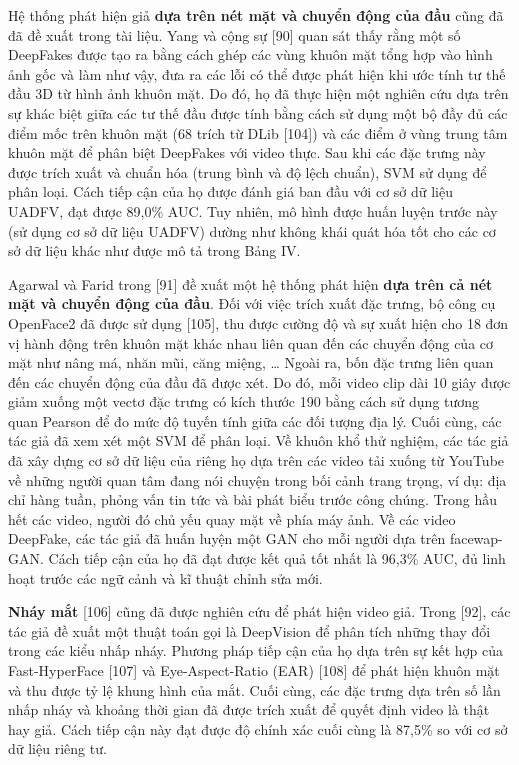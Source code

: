 \documentclass{article}
\begin{document}
Hệ thống phát hiện giả \textbf{dựa trên nét mặt và chuyển động của đầu} cũng đã đã đề xuất trong tài liệu. Yang và cộng sự [90] quan sát thấy rằng một số DeepFakes được tạo ra bằng cách ghép các vùng khuôn mặt tổng hợp vào hình ảnh gốc và làm như vậy, đưa ra các lỗi có thể được phát hiện khi ước tính tư thế đầu 3D từ hình ảnh khuôn mặt. Do đó, họ đã thực hiện một nghiên cứu dựa trên sự khác biệt giữa các tư thế đầu được tính bằng cách sử dụng một bộ đầy đủ các điểm mốc trên khuôn mặt (68 trích từ DLib [104]) và các điểm ở vùng trung tâm khuôn mặt để phân biệt DeepFakes với video thực. Sau khi các đặc trưng này được trích xuất và chuẩn hóa (trung bình và độ lệch chuẩn), SVM sử dụng để phân loại. Cách tiếp cận của họ được đánh giá ban đầu với cơ sở dữ liệu UADFV, đạt được 89,0\% AUC. Tuy nhiên, mô hình được huấn luyện trước này (sử dụng cơ sở dữ liệu UADFV) dường như không khái quát hóa tốt cho các cơ sở dữ liệu khác như được mô tả trong Bảng IV.

Agarwal và Farid trong [91] đề xuất một hệ thống phát hiện \textbf{dựa trên cả nét mặt và chuyển động của đầu}. Đối với việc trích xuất đặc trưng, bộ công cụ OpenFace2 đã được sử dụng [105], thu được cường độ và sự xuất hiện cho 18 đơn vị hành động trên khuôn mặt khác nhau liên quan đến các chuyển động của cơ mặt như nâng má, nhăn mũi, căng miệng, … Ngoài ra, bốn đặc trưng liên quan đến các chuyển động của đầu đã được xét. Do đó, mỗi video clip dài 10 giây được giảm xuống một vectơ đặc trưng có kích thước 190 bằng cách sử dụng tương quan Pearson để đo mức độ tuyến tính giữa các đối tượng địa lý. Cuối cùng, các tác giả đã xem xét một SVM để phân loại. Về khuôn khổ thử nghiệm, các tác giả đã xây dựng cơ sở dữ liệu của riêng họ dựa trên các video tải xuống từ YouTube về những người quan tâm đang nói chuyện trong bối cảnh trang trọng, ví dụ: địa chỉ hàng tuần, phỏng vấn tin tức và bài phát biểu trước công chúng. Trong hầu hết các video, người đó chủ yếu quay mặt về phía máy ảnh. Về các video DeepFake, các tác giả đã huấn luyện một GAN cho mỗi người dựa trên facewap-GAN. Cách tiếp cận của họ đã đạt được kết quả tốt nhất là 96,3\% AUC, đủ linh hoạt trước các ngữ cảnh và kĩ thuật chỉnh sửa mới.

\textbf{Nháy mắt} [106] cũng đã được nghiên cứu để phát hiện video giả. Trong [92], các tác giả đề xuất một thuật toán gọi là DeepVision để phân tích những thay đổi trong các kiểu nhấp nháy. Phương pháp tiếp cận của họ dựa trên sự kết hợp của Fast-HyperFace [107] và Eye-Aspect-Ratio (EAR) [108] để phát hiện khuôn mặt và thu được tỷ lệ khung hình của mắt. Cuối cùng, các đặc trưng dựa trên số lần nhấp nháy và khoảng thời gian đã được trích xuất để quyết định video là thật hay giả. Cách tiếp cận này đạt được độ chính xác cuối cùng là 87,5\% so với cơ sở dữ liệu riêng tư.
\end{document}
